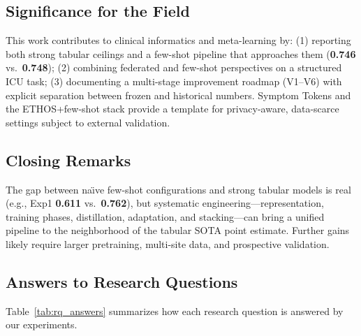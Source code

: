 \subsection{Significance for the Field}

This work contributes to clinical informatics and meta-learning by: (1) reporting both strong tabular ceilings and a few-shot pipeline that approaches them (\textbf{0.746} vs.\ \textbf{0.748}); (2) combining federated and few-shot perspectives on a structured ICU task; (3) documenting a multi-stage improvement roadmap (V1--V6) with explicit separation between frozen and historical numbers. Symptom Tokens and the ETHOS+few-shot stack provide a template for privacy-aware, data-scarce settings subject to external validation.

\subsection{Closing Remarks}

The gap between na\"{\i}ve few-shot configurations and strong tabular models is real (e.g., Exp1 \textbf{0.611} vs.\ \textbf{0.762}), but systematic engineering---representation, training phases, distillation, adaptation, and stacking---can bring a unified pipeline to the neighborhood of the tabular SOTA point estimate. Further gains likely require larger pretraining, multi-site data, and prospective validation.

\subsection{Answers to Research Questions}

Table~\ref{tab:rq_answers} summarizes how each research question is answered by our experiments.

